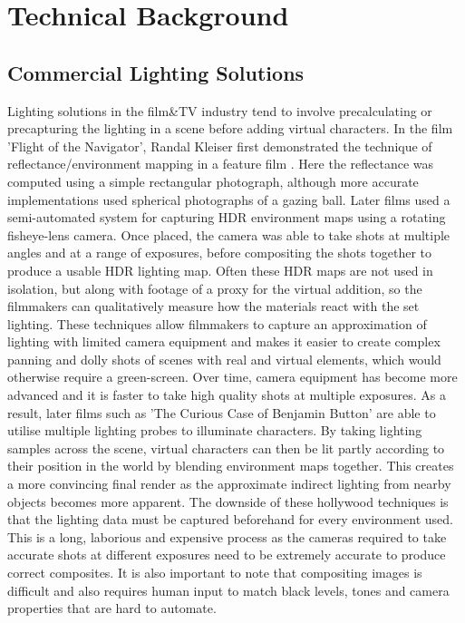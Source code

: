 \documentclass[ %
                    author={Gavin Parker},
                supervisor={Dr. Neill Campbell},
                    degree={MEng},
                     title={Deep Siamese Networks for Illumination Estimation from Stereo Images},
                  subtitle={},
                      type={research},
                      year={2018} ]{dissertation}
\begin{document}

\chapter{Technical Background}
\label{chap:technical}
\section{Commercial Lighting Solutions}
Lighting solutions in the film\&TV industry tend to involve precalculating or precapturing the lighting in a scene before adding virtual characters. In the film 'Flight of the Navigator', Randal Kleiser first demonstrated the technique of reflectance/environment mapping in a feature film \cite{navigator}. Here the reflectance was computed using a simple rectangular photograph, although more accurate implementations used spherical photographs of a gazing ball. Later films used a semi-automated system for capturing HDR environment maps using a rotating fisheye-lens camera. Once placed, the camera was able to take shots at multiple angles and at a range of exposures, before compositing the shots together to produce a usable HDR lighting map. Often these HDR maps are not used in isolation, but along with footage of a proxy for the virtual addition, so the filmmakers can qualitatively measure how the materials react with the set lighting. These techniques allow filmmakers to capture an approximation of lighting with limited camera equipment and makes it easier to create complex panning and dolly shots of scenes with real and virtual elements, which would otherwise require a green-screen. Over time, camera equipment has become more advanced and it is faster to take high quality shots at multiple exposures. As a result, later films such as 'The Curious Case of Benjamin Button' are able to utilise multiple lighting probes to illuminate characters. By taking lighting samples across the scene, virtual characters can then be lit partly according to their position in the world by blending environment maps together. This creates a more convincing final render as the approximate indirect lighting from nearby objects becomes more apparent. The downside of these hollywood techniques is that the lighting data must be captured beforehand for every environment used. This is a long, laborious and expensive process as the cameras required to take accurate shots at different exposures need to be extremely accurate to produce correct composites. It is also important to note that compositing images is difficult and also requires human input to match black levels, tones and camera properties that are hard to automate.
\end{document}
